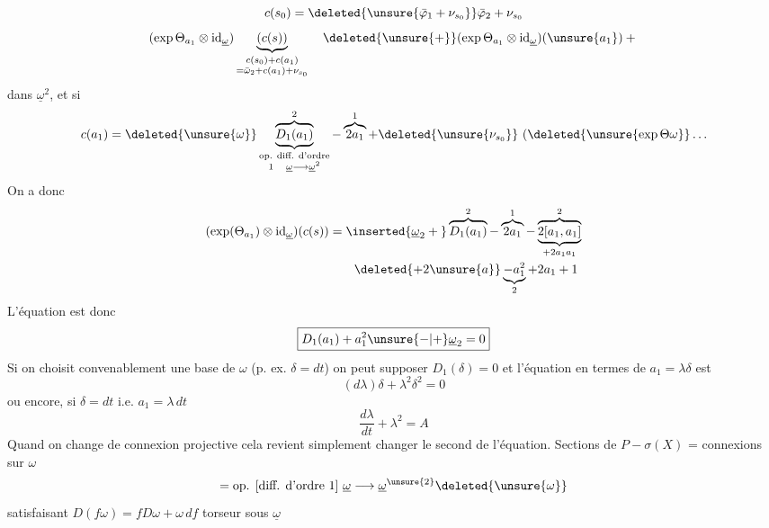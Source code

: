 \[
c(s_0)=\deleted{\unsure{\bar\varphi_1+\nu_{s_0}}}\bar\varphi_2+\nu_{s_0}
\]
\[
(\exp\Theta_{a_1}\otimes\mathrm{id}_{\underline\omega})
\underbrace{(c(s))}_{\substack{c(s_0)+c(a_1)\\=\bar\omega_2+c(a_1)+\nu_{s_0}}}
\quad\deleted{\unsure{+}}(\exp\Theta_{a_1}\otimes\mathrm{id}_{\underline\omega})(\unsure{a_1})+{}
\]
 dans $\underline\omega^2$, et si
\[
c(a_1)=\deleted{\unsure{\omega}}\underbrace{\overbrace{D_1(a_1)}^{2}}_{\substack{\text{op. diff. d'ordre}\\1\quad\underline\omega\longrightarrow\underline\omega^2}}
-\overbrace{2a_1}^{1}+\deleted{\unsure{\nu_{s_0}}}\ (\deleted{\unsure{\exp\Theta\omega}}\ldots
\]
On a donc
\[
\begin{aligned}
(\exp(\Theta_{a_1})\otimes\mathrm{id}_{\underline\omega})(c(s))
&=\inserted{\underline\omega_2+{}}\overbrace{D_1(a_1)}^{2}-\overbrace{2a_1}^{1}
-\underbrace{\overbrace{2[a_1,a_1]}^{2}}_{+2a_1a_1}\\
&\qquad\deleted{+2\unsure{a}}\underbrace{-a_1^2}_{2}+2a_1+1
\end{aligned}
\]
L'équation est donc
\[
\boxed{D_1(a_1)+a_1^2\unsure{-|+}\underline\omega_2=0}
\]
Si on choisit convenablement une base de $\omega$ (p. ex. $\delta=dt$) on peut supposer $D_1(\delta)=0$ et l'équation en termes de $a_1=\lambda\delta$ est
\[
(d\lambda)\delta+\lambda^2\delta^2=0
\]
ou encore, si $\delta=dt$ i.e. $a_1=\lambda\,dt$
\[
\boxed{\frac{d\lambda}{dt}+\lambda^2=A}
\]
Quand on change de connexion projective cela revient simplement  changer le second  de l'équation.
Sections de $P-\sigma(X)$ = connexions sur $\omega$
\[
=\text{op. [diff. d'ordre 1] }\underline\omega\longrightarrow\underline\omega^{\unsure{2}}\deleted{\unsure{\omega}}
\]
satisfaisant $D(f\omega)=fD\omega+\omega\,df$
 torseur sous $\underline\omega$

